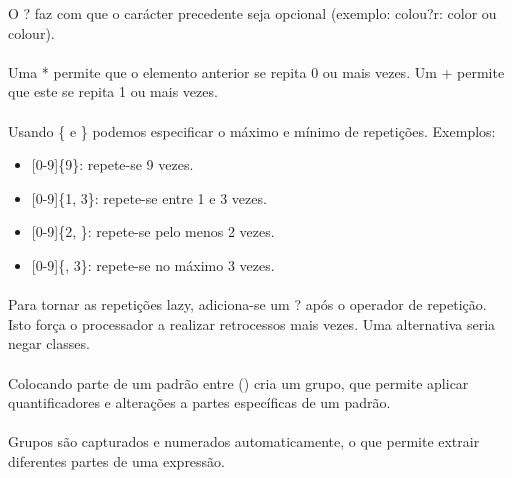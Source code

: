 \documentclass[../resumosLTW.tex]{subfiles}
\begin{document}
O ? faz com que o carácter precedente seja opcional (exemplo: colou?r: color ou colour).

\paragraph{}

Uma * permite que o elemento anterior se repita 0 ou mais vezes. 
Um + permite que este se repita 1 ou mais vezes.

\paragraph{}

Usando \{ e \} podemos especificar o máximo e mínimo de repetições. 
Exemplos:
\begin{itemize}
    \item {[0-9]}\{9\}: repete-se 9 vezes.
    \item {[0-9]}\{1, 3\}: repete-se entre 1 e 3 vezes.
    \item {[0-9]}\{2, \}: repete-se pelo menos 2 vezes.
    \item {[0-9]}\{, 3\}: repete-se no máximo 3 vezes.
\end{itemize}

\paragraph{}

Para tornar as repetições lazy, adiciona-se um ? após o operador de repetição.
Isto força o processador a realizar retrocessos mais vezes. 
Uma alternativa seria negar classes.

\paragraph{}

Colocando parte de um padrão entre () cria um grupo, que permite aplicar quantificadores e alterações a partes específicas de um padrão.

\paragraph{}

Grupos são capturados e numerados automaticamente, o que permite extrair diferentes partes de uma expressão.

\paragraph{}
\end{document}

